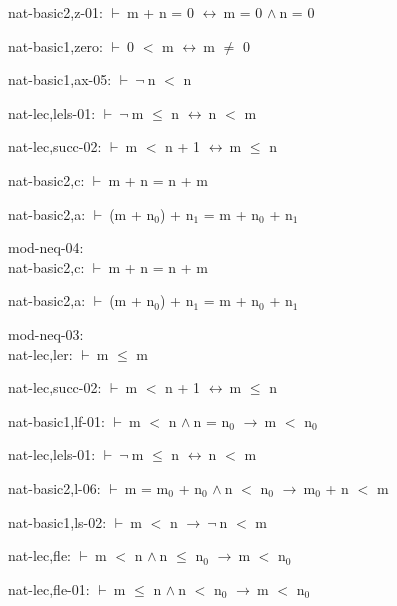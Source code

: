 \documentclass[a4paper]{article}
\newcommand{\Fol}{\mbox{$\vdash\ $}}
\newcommand{\Not}{\mbox{$\neg\ $}}
\newcommand{\And}{\mbox{$\wedge\ $}}
\newcommand{\Imp}{\mbox{$\rightarrow\ $}}
\newcommand{\Equiv}{\mbox{$\leftrightarrow\ $}}
\begin{document}
nat-basic2,z-01: 
 \Fol m + n = 0 \Equiv m = 0 \And n = 0



nat-basic1,zero: 
 \Fol 0 $<$ m \Equiv m $\neq$ 0



nat-basic1,ax-05: 
 \Fol \Not n $<$ n



nat-lec,lels-01: 
 \Fol \Not m $\le$ n \Equiv n $<$ m



nat-lec,succ-02: 
 \Fol m $<$ n + 1 \Equiv m $\le$ n



nat-basic2,c: 
 \Fol m + n = n + m



nat-basic2,a: 
 \Fol (m + $\mbox{n}_{0}$) + $\mbox{n}_{1}$ = m + $\mbox{n}_{0}$ + $\mbox{n}_{1}$



\bigskip

mod-neq-04:\\ nat-basic2,c: 
 \Fol m + n = n + m



nat-basic2,a: 
 \Fol (m + $\mbox{n}_{0}$) + $\mbox{n}_{1}$ = m + $\mbox{n}_{0}$ + $\mbox{n}_{1}$



\bigskip

mod-neq-03:\\ nat-lec,ler: 
 \Fol m $\le$ m



nat-lec,succ-02: 
 \Fol m $<$ n + 1 \Equiv m $\le$ n



nat-basic1,lf-01: 
 \Fol m $<$ n \And n = $\mbox{n}_{0}$ \Imp m $<$ $\mbox{n}_{0}$



nat-lec,lels-01: 
 \Fol \Not m $\le$ n \Equiv n $<$ m



nat-basic2,l-06: 
 \Fol m = $\mbox{m}_{0}$ + $\mbox{n}_{0}$ \And n $<$ $\mbox{n}_{0}$ \Imp $\mbox{m}_{0}$ + n $<$ m



nat-basic1,ls-02: 
 \Fol m $<$ n \Imp \Not n $<$ m



nat-lec,fle: 
 \Fol m $<$ n \And n $\le$ $\mbox{n}_{0}$ \Imp m $<$ $\mbox{n}_{0}$



nat-lec,fle-01: 
 \Fol m $\le$ n \And n $<$ $\mbox{n}_{0}$ \Imp m $<$ $\mbox{n}_{0}$
\end{document}
